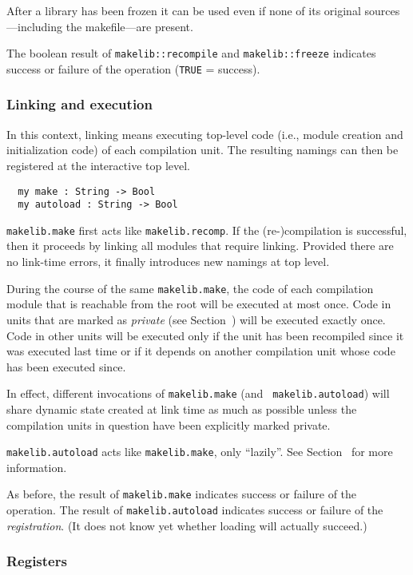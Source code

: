 After a library has been frozen it can be used even if none of its
original sources---including the makefile---are present.

The boolean result of {\tt makelib::recompile} and {\tt makelib::freeze} indicates
success or failure of the operation ({\tt TRUE} = success).

\subsubsection{Linking and execution}

In this context, linking means executing top-level code (i.e., module
creation and initialization code) of each compilation unit.  The
resulting namings can then be registered at the interactive top
level.

\begin{verbatim}
  my make : String -> Bool
  my autoload : String -> Bool
\end{verbatim}

{\tt makelib.make} first acts like {\tt makelib.recomp}.  If the
(re-)compilation is successful, then it proceeds by linking all
modules that require linking.  Provided there are no link-time errors,
it finally introduces new namings at top level.

During the course of the same {\tt makelib.make}, the code of each
compilation module that is reachable from the root will be executed at
most once.  Code in units that are marked as {\it private} (see
Section~) will be executed exactly once.  Code in
other units will be executed only if the unit has been recompiled
since it was executed last time or if it depends on another
compilation unit whose code has been executed since.

In effect, different invocations of {\tt makelib.make} (and {\tt
makelib.autoload}) will share dynamic state created at link time as much as
possible unless the compilation units in question have been explicitly
marked private.

{\tt makelib.autoload} acts like {\tt makelib.make}, only ``lazily''. See
Section~ for more information.

As before, the result of {\tt makelib.make} indicates success or failure of
the operation.  The result of {\tt makelib.autoload} indicates success or
failure of the {\em registration}.  (It does not know yet whether
loading will actually succeed.)

\subsubsection{Registers}
\label{sec:registers}

